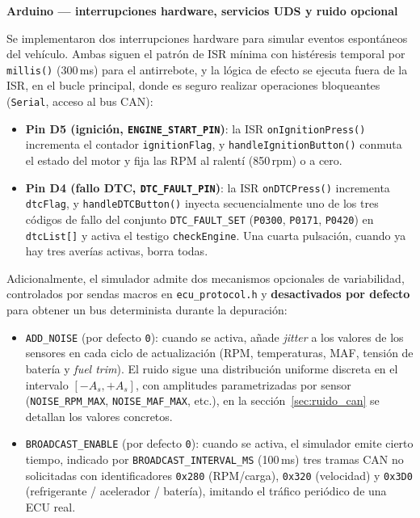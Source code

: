 \vspace{1cm}
\noindent\textbf{Arduino — interrupciones hardware, servicios UDS y ruido opcional}

Se implementaron dos interrupciones hardware para simular eventos espontáneos del vehículo. Ambas siguen el patrón de ISR mínima con histéresis temporal por \texttt{millis()} (300\,ms) para el antirrebote, y la lógica de efecto se ejecuta fuera de la ISR, en el bucle principal, donde es seguro realizar operaciones bloqueantes (\texttt{Serial}, acceso al bus CAN):

\begin{itemize}
    \item \textbf{Pin D5 (ignición, \texttt{ENGINE\_START\_PIN})}: la ISR \texttt{onIgnitionPress()} incrementa el contador \texttt{ignitionFlag}, y \texttt{handleIgnitionButton()} conmuta el estado del motor y fija las RPM al ralentí (850\,rpm) o a cero.
    \item \textbf{Pin D4 (fallo DTC, \texttt{DTC\_FAULT\_PIN})}: la ISR \texttt{onDTCPress()} incrementa \texttt{dtcFlag}, y \texttt{handleDTCButton()} inyecta secuencialmente uno de los tres códigos de fallo del conjunto \texttt{DTC\_FAULT\_SET} (\texttt{P0300}, \texttt{P0171}, \texttt{P0420}) en \texttt{dtcList[]} y activa el testigo \texttt{checkEngine}. Una cuarta pulsación, cuando ya hay tres averías activas, borra todas.
\end{itemize}

Adicionalmente, el simulador admite dos mecanismos opcionales de variabilidad, controlados por sendas macros en \texttt{ecu\_protocol.h} y \textbf{desactivados por defecto} para obtener un bus determinista durante la depuración:

\begin{itemize}
    \item \texttt{ADD\_NOISE} (por defecto \texttt{0}): cuando se activa, añade \textit{jitter} a los valores de los sensores en cada ciclo de actualización (RPM, temperaturas, MAF, tensión de batería y \textit{fuel trim}). El ruido sigue una distribución uniforme discreta en el intervalo $[-A_s, +A_s]$, con amplitudes parametrizadas por sensor (\texttt{NOISE\_RPM\_MAX}, \texttt{NOISE\_MAF\_MAX}, etc.), en la sección~\ref{sec:ruido_can} se detallan los valores concretos.
    \item \texttt{BROADCAST\_ENABLE} (por defecto \texttt{0}): cuando se activa, el simulador emite cierto tiempo, indicado por \texttt{BROADCAST\_INTERVAL\_MS} (100\,ms) tres tramas CAN no solicitadas con identificadores \texttt{0x280} (RPM/carga), \texttt{0x320} (velocidad) y \texttt{0x3D0} (refrigerante / acelerador / batería), imitando el tráfico periódico de una ECU real.
\end{itemize}

